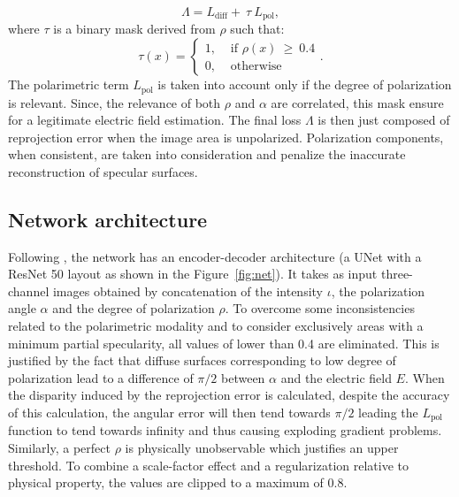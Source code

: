 \begin{equation}
\Lambda =  L_{\textrm{diff}} + ~\tau ~L_{\textrm{pol}},
\end{equation}
\noindent
where $\tau$ is a binary mask derived from $\rho$ such that:
\begin{equation}
\tau(x) = \begin{cases} 1, & \mbox{ if } \rho(x) ~ \geq ~ 0.4\\
0, & \mbox{ otherwise}\end{cases}.
\end{equation}
The polarimetric term $L_{\textrm{pol}}$ is taken into account only if the degree of polarization is relevant. Since, the relevance of both $\rho$ and $\alpha$ are correlated, this mask ensure for a legitimate electric field estimation.
The final loss $\Lambda$ is then just composed of reprojection error when the image area is unpolarized. Polarization components, when consistent, are taken into consideration and penalize the inaccurate reconstruction of specular surfaces.

\subsection{Network architecture}

Following \cite{godard2019digging}, the network has an encoder-decoder architecture (a UNet with a ResNet 50 layout as shown in the Figure~\ref{fig:net}). It takes as input three-channel images obtained by concatenation of the intensity $\iota$, the polarization angle $\alpha$ and the degree of polarization $\rho$.
To overcome some inconsistencies related to the polarimetric modality and to consider exclusively areas with a minimum partial specularity, all values of lower than
0.4 are eliminated. This is justified by the fact that diffuse surfaces corresponding to low degree of polarization lead to a difference of $\pi/2$ between $\alpha$ and the electric field $E$.
When the disparity induced by the reprojection error is calculated, despite the accuracy of this calculation, the angular error will then tend towards $\pi/2$ leading the $L_{\textrm{pol}}$ function to tend towards infinity and thus causing exploding gradient problems.\\
Similarly, a perfect $\rho$ is physically unobservable which justifies an upper threshold. To combine a scale-factor effect and a regularization relative to physical property, the values are clipped to a maximum of 0.8.

